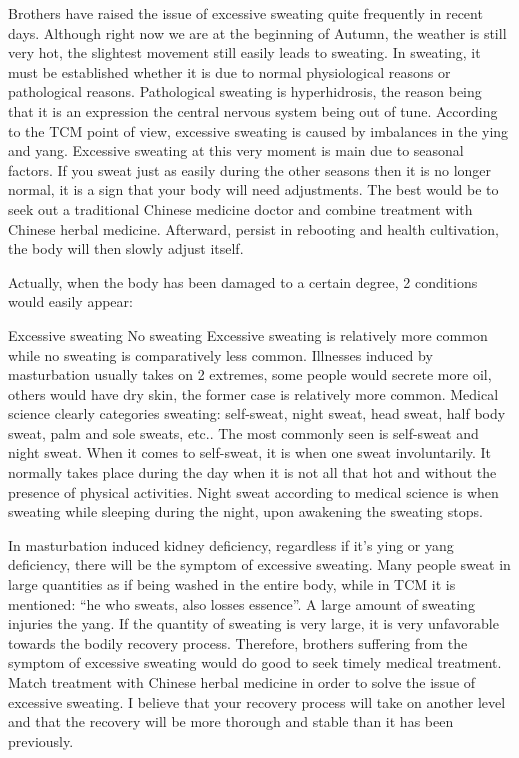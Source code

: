 \documentclass[
]{book}
\begin{document}
Brothers have raised the issue of excessive sweating quite frequently in recent days. Although right now we are at the beginning of Autumn, the weather is still very hot, the slightest movement still easily leads to sweating. In sweating, it must be established whether it is due to normal physiological reasons or pathological reasons. Pathological sweating is hyperhidrosis, the reason being that it is an expression the central nervous system being out of tune. According to the TCM point of view, excessive sweating is caused by imbalances in the ying and yang. Excessive sweating at this very moment is main due to seasonal factors. If you sweat just as easily during the other seasons then it is no longer normal, it is a sign that your body will need adjustments. The best would be to seek out a traditional Chinese medicine doctor and combine treatment with Chinese herbal medicine. Afterward, persist in rebooting and health cultivation, the body will then slowly adjust itself.

Actually, when the body has been damaged to a certain degree, 2 conditions would easily appear:

Excessive sweating
No sweating
Excessive sweating is relatively more common while no sweating is comparatively less common. Illnesses induced by masturbation usually takes on 2 extremes, some people would secrete more oil, others would have dry skin, the former case is relatively more common. Medical science clearly categories sweating: self-sweat, night sweat, head sweat, half body sweat, palm and sole sweats, etc.. The most commonly seen is self-sweat and night sweat. When it comes to self-sweat, it is when one sweat involuntarily. It normally takes place during the day when it is not all that hot and without the presence of physical activities. Night sweat according to medical science is when sweating while sleeping during the night, upon awakening the sweating stops.

In masturbation induced kidney deficiency, regardless if it's ying or yang deficiency, there will be the symptom of excessive sweating. Many people sweat in large quantities as if being washed in the entire body, while in TCM it is mentioned: ``he who sweats, also losses essence''. A large amount of sweating injuries the yang. If the quantity of sweating is very large, it is very unfavorable towards the bodily recovery process. Therefore, brothers suffering from the symptom of excessive sweating would do good to seek timely medical treatment. Match treatment with Chinese herbal medicine in order to solve the issue of excessive sweating. I believe that your recovery process will take on another level and that the recovery will be more thorough and stable than it has been previously.
\end{document}
